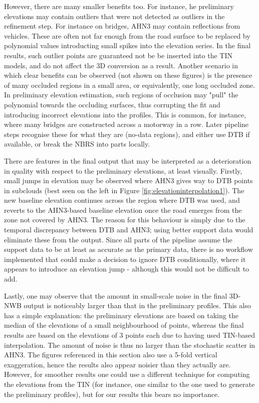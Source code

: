 However, there are many smaller benefits too. For instance, he preliminary elevations may contain outliers that were not detected as outliers in the refinement step. For instance on bridges, AHN3 may contain reflections from vehicles. These are often not far enough from the road surface to be replaced by polynomial values introducting small spikes into the elevation series. In the final results, such outlier points are guaranteed not be be inserted into the TIN models, and do not affect the 3D conversion as a result. Another scenario in which clear benefits can be observed (not shown on these figures) is the presence of many occluded regions in a small area, or equivalently, one long occluded zone. In preliminary elevation estimation, such regions of occlusion may "pull" the polynomial towards the occluding surfaces, thus corrupting the fit and introducing incorrect elevations into the profiles. This is common, for instance, where many bridges are constructed across a motorway in a row. Later pipeline steps recognise these for what they are (no-data regions), and either use DTB if available, or break the NBRS into parts locally.

There are features in the final output that may be interpreted as a deterioration in quality with respect to the preliminary elevations, at least visually. Firstly, small jumps in elevation may be observed where AHN3 gives way to DTB points in subclouds (best seen on the left in Figure \ref{fig:elevationinterpolation1}). The new baseline elevation continues across the region where DTB was used, and reverts to the AHN3-based baseline elevation once the road emerges from the zone not covered by AHN3. The reason for this behaviour is simply due to the temporal discrepancy between DTB and AHN3; using better support data would eliminate these from the output. Since all parts of the pipeline assume the support data to be at least as accurate as the primary data, there is no workflow implemented that could make a decision to ignore DTB conditionally, where it appears to introduce an elevation jump - although this would not be difficult to add.

Lastly, one may observe that the amount in small-scale noise in the final 3D-NWB output is noticeably larger than that in the preliminary profiles. This also has a simple explanation: the preliminary elevations are based on taking the median of the elevations of a small neighbourhood of points, whereas the final results are based on the elevations of 3 points each due to having used TIN-based interpolation. The amount of noise is thus no larger than the stochastic scatter in AHN3. The figures referenced in this section also use a 5-fold vertical exaggeration, hence the results also appear noisier than they actually are. However, for smoother results one could use a different technique for computing the elevations from the TIN (for instance, one similar to the one used to generate the preliminary profiles), but for our results this bears no importance.

